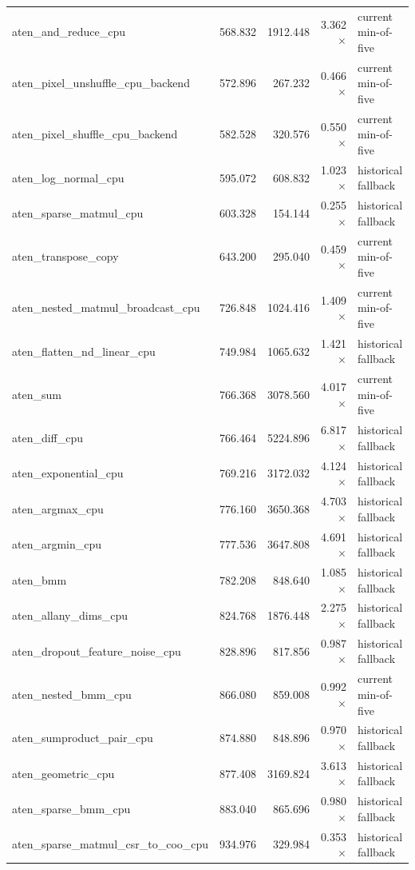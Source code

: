 \begin{longtable}{lrrrl}
  aten\_and\_reduce\_cpu & 568.832 & 1912.448 & 3.362$\times$ & current min-of-five \\
  aten\_pixel\_unshuffle\_cpu\_backend & 572.896 & 267.232 & 0.466$\times$ & current min-of-five \\
  aten\_pixel\_shuffle\_cpu\_backend & 582.528 & 320.576 & 0.550$\times$ & current min-of-five \\
  aten\_log\_normal\_cpu & 595.072 & 608.832 & 1.023$\times$ & historical fallback \\
  aten\_sparse\_matmul\_cpu & 603.328 & 154.144 & 0.255$\times$ & historical fallback \\
  aten\_transpose\_copy & 643.200 & 295.040 & 0.459$\times$ & current min-of-five \\
  aten\_nested\_matmul\_broadcast\_cpu & 726.848 & 1024.416 & 1.409$\times$ & current min-of-five \\
  aten\_flatten\_nd\_linear\_cpu & 749.984 & 1065.632 & 1.421$\times$ & historical fallback \\
  aten\_sum & 766.368 & 3078.560 & 4.017$\times$ & current min-of-five \\
  aten\_diff\_cpu & 766.464 & 5224.896 & 6.817$\times$ & historical fallback \\
  aten\_exponential\_cpu & 769.216 & 3172.032 & 4.124$\times$ & historical fallback \\
  aten\_argmax\_cpu & 776.160 & 3650.368 & 4.703$\times$ & historical fallback \\
  aten\_argmin\_cpu & 777.536 & 3647.808 & 4.691$\times$ & historical fallback \\
  aten\_bmm & 782.208 & 848.640 & 1.085$\times$ & historical fallback \\
  aten\_allany\_dims\_cpu & 824.768 & 1876.448 & 2.275$\times$ & historical fallback \\
  aten\_dropout\_feature\_noise\_cpu & 828.896 & 817.856 & 0.987$\times$ & historical fallback \\
  aten\_nested\_bmm\_cpu & 866.080 & 859.008 & 0.992$\times$ & current min-of-five \\
  aten\_sumproduct\_pair\_cpu & 874.880 & 848.896 & 0.970$\times$ & historical fallback \\
  aten\_geometric\_cpu & 877.408 & 3169.824 & 3.613$\times$ & historical fallback \\
  aten\_sparse\_bmm\_cpu & 883.040 & 865.696 & 0.980$\times$ & historical fallback \\
  aten\_sparse\_matmul\_csr\_to\_coo\_cpu & 934.976 & 329.984 & 0.353$\times$ & historical fallback \\

\end{longtable}
